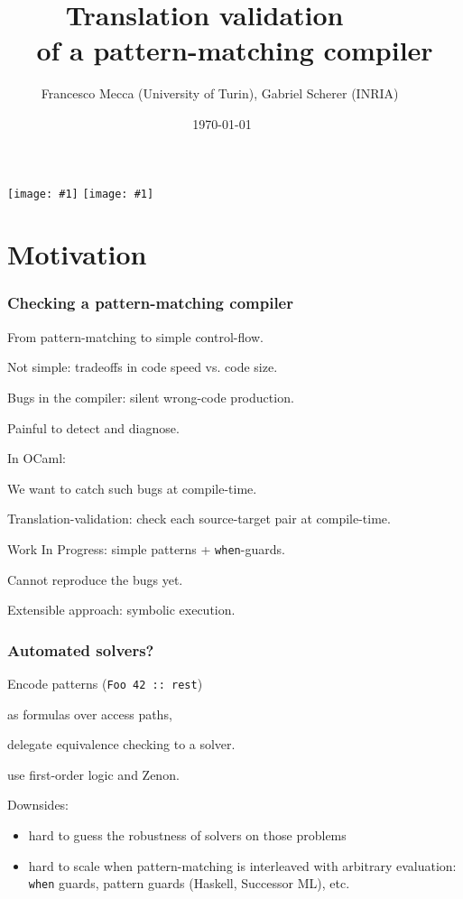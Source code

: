 \documentclass[dvipsnames]{beamer}
\title{Translation validation $\qquad$ \\ of a pattern-matching compiler $\qquad$}
\subtitle{}
\author{Francesco Mecca (University of Turin), Gabriel Scherer (INRIA) $\qquad$}
\date{\today$\qquad$}
\begin{document}

\newcommand{\showface}[1]{\texttt{[image: \#1]}}
\begin{frame}
  \titlepage

\begin{center}
  \showface{pictures/Francesco_Mecca.jpg}
  \showface{pictures/Gabriel_Scherer.jpg}
  $\qquad$
\end{center}
\end{frame}

\section{Motivation}

\begin{frame}
  \frametitle{Checking a pattern-matching compiler}

  From pattern-matching to simple control-flow.

  Not simple: tradeoffs in code speed vs. code size.

  \vfill

  Bugs in the compiler: silent wrong-code production.

  Painful to detect and diagnose.

  \vfill

  In OCaml: %

  \vfill

  We want to catch such bugs at compile-time.

  Translation-validation: check each source-target pair at compile-time.

  \vfill

  \alert{Work In Progress}: simple patterns + \texttt{when}-guards.

  Cannot reproduce the bugs yet.

  Extensible approach: symbolic execution.
\end{frame}

\begin{frame}
  \frametitle{Automated solvers?}

  Encode patterns (\lstinline{Foo 42 :: rest})

  as formulas over access paths,

  delegate equivalence checking to a solver.

  \vfill

  \citet*{tom} use first-order logic and Zenon.

  \vfill

  Downsides:
  \begin{itemize}
  \item hard to guess the robustness of solvers on those problems
  \item hard to scale when pattern-matching is interleaved with arbitrary evaluation:
    \texttt{when} guards, pattern guards (Haskell, Successor ML), etc.
  \end{itemize}

  \vfill\vfill

  
\end{frame}
\end{document}
